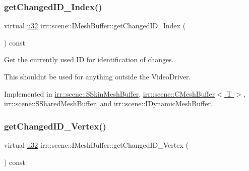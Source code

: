 \subsubsection{\texorpdfstring{get\+Changed\+I\+D\+\_\+\+Index()}{getChangedID\_Index()}}
{\footnotesize\ttfamily virtual \hyperlink{namespaceirr_a0416a53257075833e7002efd0a18e804}{u32} irr\+::scene\+::\+I\+Mesh\+Buffer\+::get\+Changed\+I\+D\+\_\+\+Index (\begin{DoxyParamCaption}{ }\end{DoxyParamCaption}) const\hspace{0.3cm}{\ttfamily [pure virtual]}}



Get the currently used ID for identification of changes. 

This shouldn\textquotesingle{}t be used for anything outside the Video\+Driver. 

Implemented in \hyperlink{structirr_1_1scene_1_1SSkinMeshBuffer_a60b444cfe4b0cec6d2cc4bdf7958dd16}{irr\+::scene\+::\+S\+Skin\+Mesh\+Buffer}, \hyperlink{classirr_1_1scene_1_1CMeshBuffer_aec6786022abd81ddf8d4e79a23628944}{irr\+::scene\+::\+C\+Mesh\+Buffer$<$ T $>$}, \hyperlink{structirr_1_1scene_1_1SSharedMeshBuffer_a0a37d52f7ec9917d9ca0d9dd908917b9}{irr\+::scene\+::\+S\+Shared\+Mesh\+Buffer}, and \hyperlink{classirr_1_1scene_1_1IDynamicMeshBuffer_a2514a3d0e4865b7b9714fe1f9f58ad51}{irr\+::scene\+::\+I\+Dynamic\+Mesh\+Buffer}.

\mbox{\label{classirr_1_1scene_1_1IMeshBuffer_aba48df31edf92a0117692c0be02298db}} 
\subsubsection{\texorpdfstring{get\+Changed\+I\+D\+\_\+\+Vertex()}{getChangedID\_Vertex()}}
{\footnotesize\ttfamily virtual \hyperlink{namespaceirr_a0416a53257075833e7002efd0a18e804}{u32} irr\+::scene\+::\+I\+Mesh\+Buffer\+::get\+Changed\+I\+D\+\_\+\+Vertex (\begin{DoxyParamCaption}{ }\end{DoxyParamCaption}) const\hspace{0.3cm}{\ttfamily [pure virtual]}}



